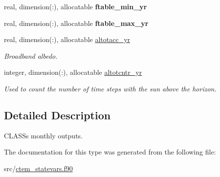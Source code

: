 \begin{DoxyCompactItemize}
\item 
\hypertarget{structctem__statevars_1_1class__moyr__output_aedfcc8503754c0ca435fb4a8dbe6163a}{}real, dimension(\+:), allocatable {\bfseries ftable\+\_\+min\+\_\+yr}\label{structctem__statevars_1_1class__moyr__output_aedfcc8503754c0ca435fb4a8dbe6163a}

\item 
\hypertarget{structctem__statevars_1_1class__moyr__output_a57c77faccee25dbc4e1f5cec15a6d5ec}{}real, dimension(\+:), allocatable {\bfseries ftable\+\_\+max\+\_\+yr}\label{structctem__statevars_1_1class__moyr__output_a57c77faccee25dbc4e1f5cec15a6d5ec}

\item 
\hypertarget{structctem__statevars_1_1class__moyr__output_a0d56d118f2d7264279f2193aab887867}{}real, dimension(\+:), allocatable \hyperlink{structctem__statevars_1_1class__moyr__output_a0d56d118f2d7264279f2193aab887867}{altotacc\+\_\+yr}\label{structctem__statevars_1_1class__moyr__output_a0d56d118f2d7264279f2193aab887867}

\begin{DoxyCompactList}\small\item\em Broadband albedo. \end{DoxyCompactList}\item 
\hypertarget{structctem__statevars_1_1class__moyr__output_a0c0d34b7bf22068a3bb26dd81486aba2}{}integer, dimension(\+:), allocatable \hyperlink{structctem__statevars_1_1class__moyr__output_a0c0d34b7bf22068a3bb26dd81486aba2}{altotcntr\+\_\+yr}\label{structctem__statevars_1_1class__moyr__output_a0c0d34b7bf22068a3bb26dd81486aba2}

\begin{DoxyCompactList}\small\item\em Used to count the number of time steps with the sun above the horizon. \end{DoxyCompactList}\end{DoxyCompactItemize}


\subsection{Detailed Description}
C\+L\+A\+S\+S\textquotesingle{}s monthly outputs. 

The documentation for this type was generated from the following file\+:\begin{DoxyCompactItemize}
\item 
src/\hyperlink{ctem__statevars_8f90}{ctem\+\_\+statevars.\+f90}\end{DoxyCompactItemize}
